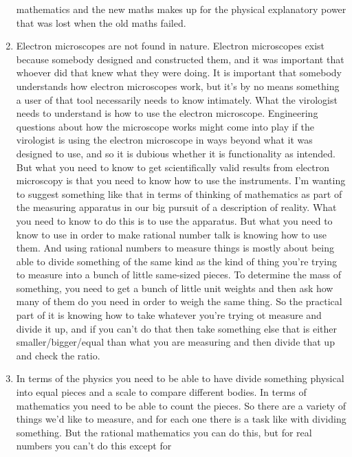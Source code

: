 \documentclass[12pt]{article}
\theoremstyle{definition}
\begin{document}
\begin{enumerate}
        mathematics and the new maths makes up for the physical explanatory
        power that was lost when the old maths failed.
    \item
        Electron microscopes are not found in nature. Electron microscopes
        exist because somebody designed and constructed them, and it was
        important that whoever did that knew what they were doing. It is
        important that somebody understands how electron microscopes work, but
        it's by no means something a user of that tool necessarily needs to
        know intimately. What the virologist needs to understand is how to use
        the electron microscope. Engineering questions about how the microscope
        works might come into play if the virologist is using the electron
        microscope in ways beyond what it was designed to use, and so it is
        dubious whether it is functionality as intended. But what you need to
        know to get scientifically valid results from electron microscopy is
        that you need to know how to use the instruments. I'm wanting to
        suggest something like that in terms of thinking of mathematics as part
        of the measuring apparatus in our big pursuit of a description of
        reality. What you need to know to do this is to use the apparatus. But
        what you need to know to use in order to make rational number talk is
        knowing how to use them. And using rational numbers to measure things
        is mostly about being able to divide something of the same kind as the
        kind of thing you're trying to measure into a bunch of little
        same-sized pieces. To determine the mass of something, you need to get
        a bunch of little unit weights and then ask how many of them do you
        need in order to weigh the same thing. So the practical part of it is
        knowing how to take whatever you're trying ot measure and divide it up,
        and if you can't do that then take something else that is either
        smaller/bigger/equal than what you are measuring and then divide that
        up and check the ratio. 
    \item
        In terms of the physics you need to be able to have divide something
        physical into equal pieces and a scale to compare different bodies. In
        terms of mathematics you need to be able to count the pieces. So there
        are a variety of things we'd like to measure, and for each one there is
        a task like with dividing something. But the rational mathematics you
        can do this, but for real numbers you can't do this except for

\end{enumerate}
\end{document}
